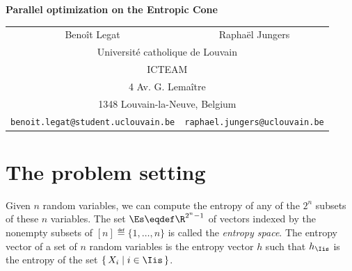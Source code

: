 \documentclass[12pt]{article}
\begin{document}
\baselineskip 12pt

\begin{center}
\textbf{\Large Parallel optimization on the Entropic Cone} \\
\vspace{5mm}
\begin{tabular}{cc}  Beno\^it Legat  & Rapha\"el Jungers \\[1.2\baselineskip]
\multicolumn{2}{c}{Universit\'e catholique de Louvain} \\
\multicolumn{2}{c}{ICTEAM} \\
\multicolumn{2}{c}{4 Av. G. Lema\^itre} \\
\multicolumn{2}{c}{1348 Louvain-la-Neuve, Belgium} \\ [1.2\baselineskip]
 \verb+benoit.legat@student.uclouvain.be+ & \verb+raphael.jungers@uclouvain.be+
\end{tabular} \end{center}

\begin{abstract}

\noindent
  We introduce a parallelizable algorithm for approximate optimization on the entropic cone.
  We also present the toolbox \texttt{EntropicCone.jl}.
  Its aim is to improve the computational repoducibility of the recent progress
  on the approximation of the entropic cone
  and to make them easily accessible for its many applications.
  These applications include
  the capacity region of multi-source network coding,
  converse theorems for multi-terminal problems of information theory,
  bounds on the information ratios in secret sharing schemes and
  conditional independence among subvectors of a random vector. %
\end{abstract}

\section{The problem setting}





Given $n$ random variables, we can compute the entropy of any of the $2^n$ subsets of these $n$ variables.
The set $\Es \eqdef \R^{2^n-1}$ of vectors indexed by the nonempty subsets of $[n] \eqdef \{1, \ldots, n\}$ is called the \emph{entropy space}.%
The entropy vector of a set of $n$ random variables is the entropy vector $h$
such that $h_\Iis$ is the entropy of the set $\{\, X_i \mid i \in \Iis\,\}$.
\end{document}
